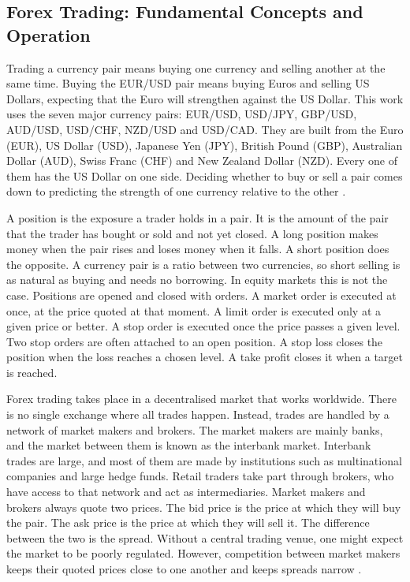 \subsection{Forex Trading: Fundamental Concepts and Operation}

Trading a currency pair means buying one currency and selling another at the same time. Buying the EUR/USD pair means buying Euros and selling US Dollars, expecting that the Euro will strengthen against the US Dollar. This work uses the seven major currency pairs: EUR/USD, USD/JPY, GBP/USD, AUD/USD, USD/CHF, NZD/USD and USD/CAD. They are built from the Euro (EUR), US Dollar (USD), Japanese Yen (JPY), British Pound (GBP), Australian Dollar (AUD), Swiss Franc (CHF) and New Zealand Dollar (NZD). Every one of them has the US Dollar on one side. Deciding whether to buy or sell a pair comes down to predicting the strength of one currency relative to the other \cite{donnelly_art_2019}.

A position is the exposure a trader holds in a pair. It is the amount of the pair that the trader has bought or sold and not yet closed. A long position makes money when the pair rises and loses money when it falls. A short position does the opposite. A currency pair is a ratio between two currencies, so short selling is as natural as buying and needs no borrowing. In equity markets this is not the case. Positions are opened and closed with orders. A market order is executed at once, at the price quoted at that moment. A limit order is executed only at a given price or better. A stop order is executed once the price passes a given level. Two stop orders are often attached to an open position. A stop loss closes the position when the loss reaches a chosen level. A take profit closes it when a target is reached.

Forex trading takes place in a decentralised market that works worldwide. There is no single exchange where all trades happen. Instead, trades are handled by a network of market makers and brokers. The market makers are mainly banks, and the market between them is known as the interbank market. Interbank trades are large, and most of them are made by institutions such as multinational companies and large hedge funds. Retail traders take part through brokers, who have access to that network and act as intermediaries. Market makers and brokers always quote two prices. The bid price is the price at which they will buy the pair. The ask price is the price at which they will sell it. The difference between the two is the spread. Without a central trading venue, one might expect the market to be poorly regulated. However, competition between market makers keeps their quoted prices close to one another and keeps spreads narrow \cite{donnelly_art_2019}.

